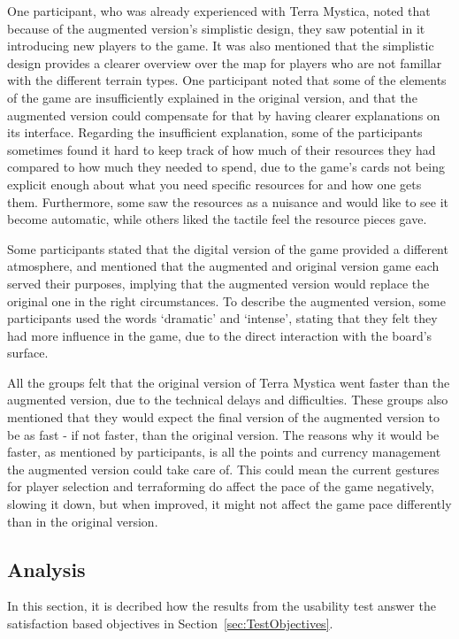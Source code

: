 One participant, who was already experienced with Terra Mystica, noted that because of the augmented version’s simplistic design, they saw potential in it introducing new players to the game. It was also mentioned that the simplistic design provides a clearer overview over the map for players who are not famillar with the different terrain types. One participant noted that some of the elements of the game are insufficiently explained in the original version, and that the augmented version could compensate for that by having clearer explanations on its interface.  Regarding the insufficient explanation, some of the participants sometimes found it hard to keep track of how much of their resources they had compared to how much they needed to spend, due to the game's cards not being explicit enough about what you need specific resources for and how one gets them. Furthermore, some saw the resources as a nuisance and would like to see it become automatic, while others liked the tactile feel the resource pieces gave.

Some participants stated that the digital version of the game provided a different atmosphere, and mentioned that the augmented and original version game each served their purposes, implying that the augmented version would replace the original one in the right circumstances. To describe the augmented version, some participants used the words ‘dramatic’ and ‘intense’, stating that they felt they had more influence in the game, due to the direct interaction with the board’s surface.

All the groups felt that the original version of Terra Mystica went faster than the augmented version, due to the technical delays and difficulties. These groups also mentioned that they would expect the final version of the augmented version to be as fast - if not faster, than the original version. The reasons why it would be faster, as mentioned by participants, is all the points and currency management the augmented version could take care of. This could mean the current gestures for player selection and terraforming do affect the pace of the game negatively, slowing it down, but when improved, it might not affect the game pace differently than in the original version.

\subsection{Analysis}
In this section, it is decribed how the results from the usability test answer the satisfaction based objectives in Section~\ref{sec:TestObjectives}.

